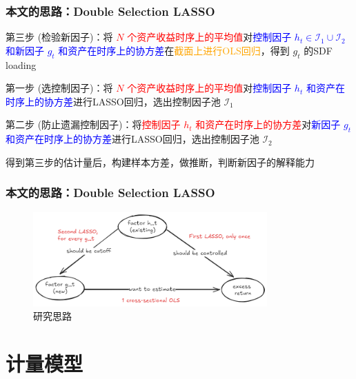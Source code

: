 \documentclass[
  UTF8,
  xcolor={dvipsnames,rgb},
  hyperref={colorlinks, citecolor=orange, linkcolor=black},
  aspectratio=169
  ]{beamer}
\begin{document}
\begin{frame}
    \frametitle{本文的思路：Double Selection LASSO}

    \begin{wideitemize}
        \item 第三步 (检验新因子)：将 \textcolor{red}{\(N\) 个资产收益时序上的平均值}对\textcolor{blue}{控制因子 \(h_{t} \in \mathcal{I}_1 \cup \mathcal{I}_2\) 和新因子 \(g_{t}\) 和资产在时序上的协方差}在\textcolor{orange}{截面上进行OLS回归}，得到 \(g_{t}\) 的SDF loading
        \item 第一步 (选控制因子)：将 \textcolor{red}{\(N\) 个资产收益时序上的平均值}对\textcolor{blue}{控制因子 \(h_{t}\) 和资产在时序上的协方差}进行LASSO回归，选出控制因子池 \(\mathcal{I}_1\)
        \item 第二步 (防止遗漏控制因子)：将\textcolor{red}{控制因子 \(h_{t}\) 和资产在时序上的协方差}对\textcolor{blue}{新因子 \(g_{t}\) 和资产在时序上的协方差}进行LASSO回归，选出控制因子池 \(\mathcal{I}_2\)
        \item 得到第三步的估计量后，构建样本方差，做推断，判断新因子的解释能力
    \end{wideitemize}

\end{frame}

\begin{frame}
    \frametitle{本文的思路：Double Selection LASSO}

    \begin{figure}[H]
    \begin{center}
    \includegraphics[width=0.8\textwidth]{../assets/idea.png}
    \end{center}
    \caption{研究思路}
    \label{pic:1}
    \end{figure}

\end{frame}

\section{计量模型}
\end{document}

